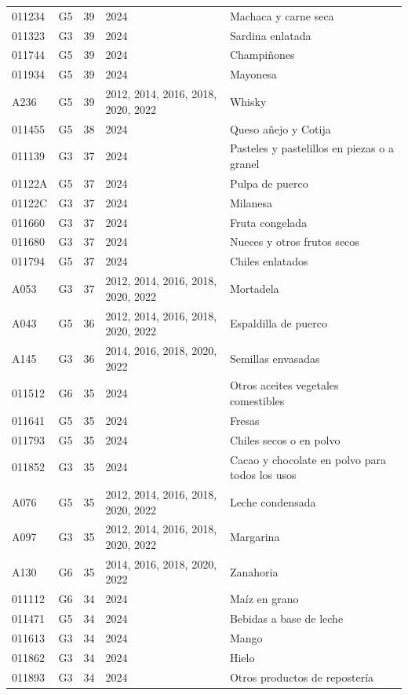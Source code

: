 \begin{table}[ht]
\begin{tabular}{llrll}
  011234 & G5 &  39 & 2024 & Machaca y carne seca \\ 
  011323 & G3 &  39 & 2024 & Sardina enlatada \\ 
  011744 & G5 &  39 & 2024 & Champiñones \\ 
  011934 & G5 &  39 & 2024 & Mayonesa \\ 
  A236 & G5 &  39 & 2012, 2014, 2016, 2018, 2020, 2022 & Whisky \\ 
  011455 & G5 &  38 & 2024 & Queso añejo y Cotija \\ 
  011139 & G3 &  37 & 2024 & Pasteles y pastelillos en piezas o a granel \\ 
  01122A & G5 &  37 & 2024 & Pulpa de puerco \\ 
  01122C & G3 &  37 & 2024 & Milanesa \\ 
  011660 & G3 &  37 & 2024 & Fruta congelada \\ 
  011680 & G3 &  37 & 2024 & Nueces y otros frutos secos \\ 
  011794 & G5 &  37 & 2024 & Chiles enlatados \\ 
  A053 & G3 &  37 & 2012, 2014, 2016, 2018, 2020, 2022 & Mortadela \\ 
  A043 & G5 &  36 & 2012, 2014, 2016, 2018, 2020, 2022 & Espaldilla de puerco \\ 
  A145 & G3 &  36 & 2014, 2016, 2018, 2020, 2022 & Semillas envasadas \\ 
  011512 & G6 &  35 & 2024 & Otros aceites vegetales comestibles \\ 
  011641 & G5 &  35 & 2024 & Fresas \\ 
  011793 & G5 &  35 & 2024 & Chiles secos o en polvo \\ 
  011852 & G3 &  35 & 2024 & Cacao y chocolate en polvo para todos los usos \\ 
  A076 & G5 &  35 & 2012, 2014, 2016, 2018, 2020, 2022 & Leche condensada \\ 
  A097 & G3 &  35 & 2012, 2014, 2016, 2018, 2020, 2022 & Margarina \\ 
  A130 & G6 &  35 & 2014, 2016, 2018, 2020, 2022 & Zanahoria \\ 
  011112 & G6 &  34 & 2024 & Maíz en grano \\ 
  011471 & G5 &  34 & 2024 & Bebidas a base de leche \\ 
  011613 & G3 &  34 & 2024 & Mango \\ 
  011862 & G3 &  34 & 2024 & Hielo \\ 
  011893 & G3 &  34 & 2024 & Otros productos de repostería \\ 

\end{tabular}
\end{table}
